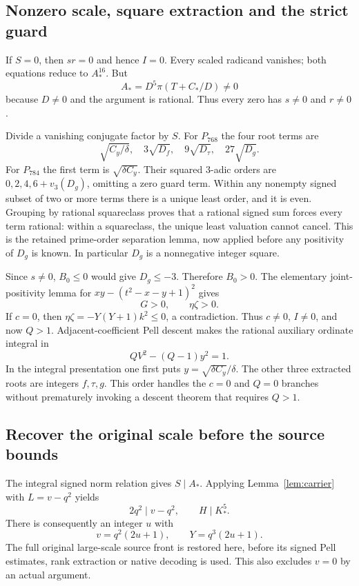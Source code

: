 \documentclass[11pt]{article}
\theoremstyle{definition}\newtheorem{definition}[theorem]{Definition}
\theoremstyle{remark}\newtheorem{remark}[theorem]{Remark}
\begin{document}
\subsection{Nonzero scale, square extraction and the strict guard}
If $S=0$, then $sr=0$ and hence $I=0$. Every scaled radicand vanishes;
both equations reduce to $A_*^{16}$. But
\[
 A_*=D^5\pi(T+C_*/D)\ne0
\]
because $D\ne0$ and the argument is rational. Thus every zero has
$s\ne0$ and $r\ne0$.

Divide a vanishing conjugate factor by $S$. For $P_{768}$ the four root
terms are
\[
 \sqrt{C_y/\delta},\quad3\sqrt{D_f},\quad9\sqrt{D_\tau},
 \quad27\sqrt{D_g}.
\]
For $P_{784}$ the first term is $\sqrt{\delta C_y}$. Their squared
$3$-adic orders are $0,2,4,6+v_3(D_g)$, omitting a zero guard term.
Within any nonempty signed subset of two or more terms there is a unique
least order, and it is even. Grouping by rational squareclass proves that
a rational signed sum forces every term rational: within a squareclass,
the unique least valuation cannot cancel. This is the retained
prime-order separation lemma, now applied before any positivity of $D_g$
is known. In particular $D_g$ is a nonnegative integer square.

Since $s\ne0$, $B_0\le0$ would give $D_g\le-3$. Therefore $B_0>0$.
The elementary joint-positivity lemma for
$xy-(t^2-x-y+1)^2$ gives
\begin{equation}\label{eq:strict}
 G>0,\qquad\eta\zeta>0.
\end{equation}
If $c=0$, then
$\eta\zeta=-Y(Y+1)k^2\le0$, a contradiction. Thus $c\ne0$, $I\ne0$,
and now $Q>1$. Adjacent-coefficient Pell descent makes the rational
auxiliary ordinate integral in
\begin{equation}\label{eq:aux}
 QV^2-(Q-1)y^2=1.
\end{equation}
In the integral presentation one first puts
$y=\sqrt{\delta C_y}/\delta$. The other three extracted roots are
integers $f,\tau,g$. This order handles the $c=0$ and $Q=0$ branches
without prematurely invoking a descent theorem that requires $Q>1$.

\subsection{Recover the original scale before the source bounds}
The integral signed norm relation gives $S\mid A_*$. Applying
Lemma~\ref{lem:carrier} with $L=v-q^2$ yields
\[
 2q^2\mid v-q^2,\qquad H\mid K_*^5.
\]
There is consequently an integer $u$ with
\begin{equation}\label{eq:recoverY}
 v=q^2(2u+1),\qquad Y=q^3(2u+1).
\end{equation}
The full original large-scale source front is restored here, before its
signed Pell estimates, rank extraction or native decoding is used. This
also excludes $v=0$ by an actual argument.
\end{document}
